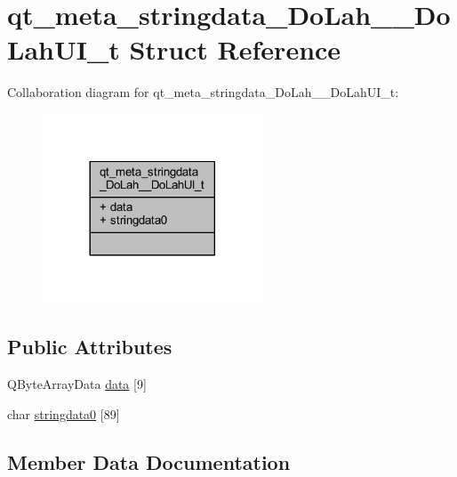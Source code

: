 \hypertarget{structqt__meta__stringdata___do_lah_____do_lah_u_i__t}{}\section{qt\+\_\+meta\+\_\+stringdata\+\_\+\+Do\+Lah\+\_\+\+\_\+\+Do\+Lah\+U\+I\+\_\+t Struct Reference}
\label{structqt__meta__stringdata___do_lah_____do_lah_u_i__t}


Collaboration diagram for qt\+\_\+meta\+\_\+stringdata\+\_\+\+Do\+Lah\+\_\+\+\_\+\+Do\+Lah\+U\+I\+\_\+t\+:\nopagebreak
\begin{figure}[H]
\begin{center}
\leavevmode
\includegraphics[width=185pt]{structqt__meta__stringdata___do_lah_____do_lah_u_i__t__coll__graph}
\end{center}
\end{figure}
\subsection*{Public Attributes}
\begin{DoxyCompactItemize}
\item 
Q\+Byte\+Array\+Data \hyperlink{structqt__meta__stringdata___do_lah_____do_lah_u_i__t_a4e53868f0a83dd2ef7991c39f77db48f}{data} \mbox{[}9\mbox{]}
\item 
char \hyperlink{structqt__meta__stringdata___do_lah_____do_lah_u_i__t_ab8944e890bd534b11f586f8bd00b4e03}{stringdata0} \mbox{[}89\mbox{]}
\end{DoxyCompactItemize}


\subsection{Member Data Documentation}
\hypertarget{structqt__meta__stringdata___do_lah_____do_lah_u_i__t_a4e53868f0a83dd2ef7991c39f77db48f}{}

